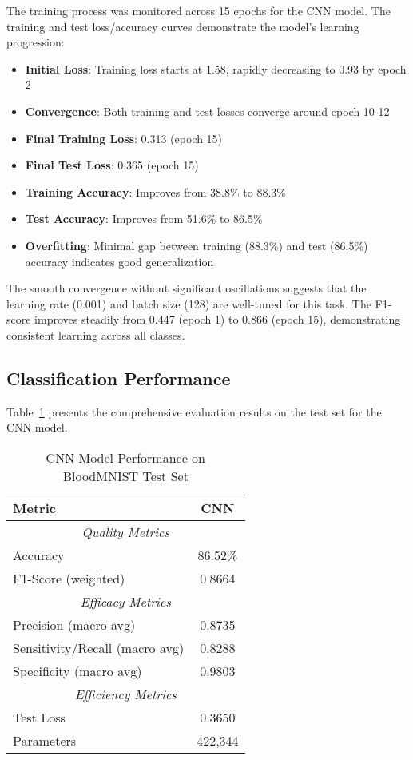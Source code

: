 \documentclass[runningheads]{llncs}
\begin{document}
The training process was monitored across 15 epochs for the CNN model. The training and test loss/accuracy curves demonstrate the model's learning progression:

\begin{itemize}
    \item \textbf{Initial Loss}: Training loss starts at 1.58, rapidly decreasing to 0.93 by epoch 2
    \item \textbf{Convergence}: Both training and test losses converge around epoch 10-12
    \item \textbf{Final Training Loss}: 0.313 (epoch 15)
    \item \textbf{Final Test Loss}: 0.365 (epoch 15)
    \item \textbf{Training Accuracy}: Improves from 38.8\% to 88.3\%
    \item \textbf{Test Accuracy}: Improves from 51.6\% to 86.5\%
    \item \textbf{Overfitting}: Minimal gap between training (88.3\%) and test (86.5\%) accuracy indicates good generalization
\end{itemize}

The smooth convergence without significant oscillations suggests that the learning rate (0.001) and batch size (128) are well-tuned for this task. The F1-score improves steadily from 0.447 (epoch 1) to 0.866 (epoch 15), demonstrating consistent learning across all classes.

\subsection{Classification Performance}

Table~\ref{tab:results} presents the comprehensive evaluation results on the test set for the CNN model.

\begin{table}[htbp]
\centering
\caption{CNN Model Performance on BloodMNIST Test Set}
\label{tab:results}
\begin{tabular}{lc}
\toprule
\textbf{Metric} & \textbf{CNN} \\
\midrule
\multicolumn{2}{c}{\textit{Quality Metrics}} \\
Accuracy & 86.52\% \\
F1-Score (weighted) & 0.8664 \\
\midrule
\multicolumn{2}{c}{\textit{Efficacy Metrics}} \\
Precision (macro avg) & 0.8735 \\
Sensitivity/Recall (macro avg) & 0.8288 \\
Specificity (macro avg) & 0.9803 \\
\midrule
\multicolumn{2}{c}{\textit{Efficiency Metrics}} \\
Test Loss & 0.3650 \\
Parameters & 422,344 \\
\bottomrule
\end{tabular}
\end{table}
\end{document}

